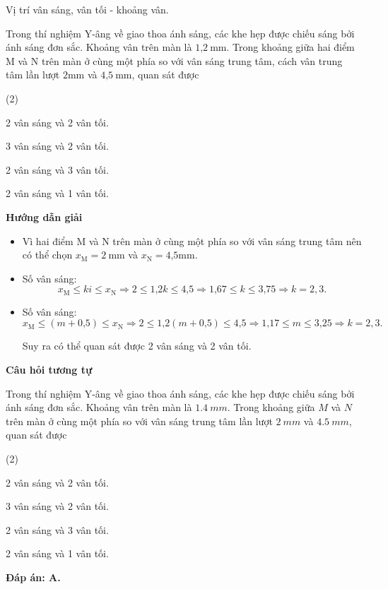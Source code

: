 \begin{dang}{Vị trí vân sáng, vân tối - khoảng vân.}
	{
		Trong thí nghiệm Y-âng về giao thoa ánh sáng, các khe hẹp được chiếu sáng bởi ánh sáng đơn sắc. Khoảng vân trên màn là $\text{1,2}\ \text{mm}$. Trong khoảng giữa hai điểm M và N trên màn ở cùng một phía so với vân sáng trung tâm, cách vân trung tâm lần lượt $2 \text{mm}$ và $\text{4,5}\ \text{mm}$, quan sát được
		\begin{mcq}(2)
			\item 2 vân sáng và 2 vân tối.		
			\item 3 vân sáng và 2 vân tối.
			\item 2 vân sáng và 3 vân tối.		
			\item 2 vân sáng và 1 vân tối.
		\end{mcq}
	}
	{
		\begin{center}
			\textbf{Hướng dẫn giải}
		\end{center}
		
		\begin{itemize}
			
			\item Vì hai điểm M và N trên màn ở cùng một phía so với vân sáng trung tâm nên có thể chọn $x_{\text{M}}= 2\ \text{mm}$ và $x_{\text{N}}= \text{4,5} \text{mm}$.
			
			\item Số vân sáng:
			\begin{equation*}
				x_{\text{M}} \leq  ki \leq x_{\text{N}} \Rightarrow 2 \leq \text{1,2} k \leq \text{4,5} \Rightarrow \text{1,67}  \leq k \leq \text{3,75} \Rightarrow k = 2, 3. 
			\end{equation*}
			\item Số vân sáng:
			\begin{equation*}
				x_{\text{M}} \leq  (m+\text{0,5}) \leq x_{\text{N}} \Rightarrow 2 \leq \text{1,2} (m+\text{0,5}) \leq \text{4,5} \Rightarrow \text{1,17}  \leq m \leq \text{3,25} \Rightarrow k = 2, 3. 
			\end{equation*}
			
			Suy ra có thể quan sát được 2 vân sáng và 2 vân tối.
		\end{itemize}		
		
		\begin{center}
			\textbf{Câu hỏi tương tự}
		\end{center}
		
		Trong thí nghiệm Y-âng về giao thoa ánh sáng, các khe hẹp được chiếu sáng bởi ánh sáng đơn sắc. Khoảng vân trên màn là $ \SI{1,4}{mm} $. Trong khoảng giữa $ M $ và $ N $ trên màn ở cùng một phía so với vân sáng trung tâm lần lượt $ \SI{2}{mm} $ và $ \SI{4,5}{mm} $, quan sát được	
		\begin{mcq}(2)
			\item 2 vân sáng và 2 vân tối.		
			\item 3 vân sáng và 2 vân tối.
			\item 2 vân sáng và 3 vân tối.		
			\item 2 vân sáng và 1 vân tối.
		\end{mcq}	
		\textbf{Đáp án: A.}
	}
\end{dang}


